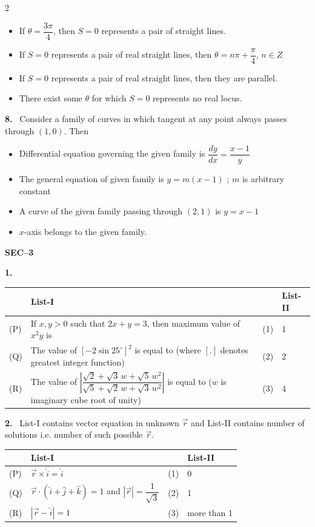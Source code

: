 \documentclass[10pt]{extarticle}
\newcommand{\sect}[1]{\par\smallskip\noindent\textbf{#1}\par}
\newcommand{\qn}[1]{\par\smallskip\noindent\textbf{#1.}~}
\newenvironment{qoptions}{\begin{itemize}[leftmargin=1.8em,itemsep=1pt,topsep=2pt,label={}]}{\end{itemize}}
\newcommand{\opt}[2]{\item[(#1)] #2}
\begin{document}
\begin{multicols}{2}
\begin{qoptions}
\opt{A}{If $\theta=\dfrac{3\pi}4$, then $S=0$ represents a pair of straight lines.}
\opt{B}{If $S=0$ represents a pair of real straight lines, then $\theta=n\pi+\dfrac\pi4$, $n\in Z$}
\opt{C}{If $S=0$ represents a pair of real straight lines, then they are parallel.}
\opt{D}{There exist some $\theta$ for which $S=0$ represents no real locus.}
\end{qoptions}
\qn{8} Consider a family of curves in which tangent at any point always passes through $(1,0)$. Then
\begin{qoptions}
\opt{A}{Differential equation governing the given family is $\dfrac{dy}{dx}=\dfrac{x-1}y$}
\opt{B}{The general equation of given family is $y=m(x-1)$ ; $m$ is arbitrary constant}
\opt{C}{A curve of the given family passing through $(2,1)$ is $y=x-1$}
\opt{D}{$x$-axis belongs to the given family.}
\end{qoptions}
\sect{SEC--3}
\qn{1}
\end{multicols}
\begin{center}\small
\begin{tabular}{|p{1cm}|p{8.5cm}|p{1cm}|p{1.5cm}|}\hline
 & \textbf{List-I} & & \textbf{List-II}\\\hline
(P) & If $x,y>0$ such that $2x+y=3$, then maximum value of $x^2y$ is & (1) & 1\\\hline
(Q) & The value of $[-2\sin25^\circ]^2$ is equal to \newline (where $[.]$ denotes greatest integer function) & (2) & 2\\\hline
(R) & The value of $\left|\dfrac{\sqrt2+\sqrt3\,w+\sqrt5\,w^2}{\sqrt5+\sqrt2\,w+\sqrt3\,w^2}\right|$ is equal to \newline ($w$ is imaginary cube root of unity) & (3) & 4\\\hline
\end{tabular}
\end{center}
\noindent\qn{2} List-I contains vector equation in unknown $\vec r$ and List-II contains number of solutions i.e. number of such possible $\vec r$.\par\nopagebreak\smallskip
\begin{center}\small
\begin{tabular}{|p{1cm}|p{6cm}|p{1cm}|p{3cm}|}\hline
 & \textbf{List-I} & & \textbf{List-II}\\\hline
(P) & $\vec r\times\hat i=\hat i$ & (1) & 0\\\hline
(Q) & $\vec r\cdot(\hat i+\hat j+\hat k)=1$ and $|\vec r|=\dfrac1{\sqrt3}$ & (2) & 1\\\hline
(R) & $\left|\vec r-\hat i\right|=1$ & (3) & more than 1\\\hline
\end{tabular}
\end{center}
\end{document}
